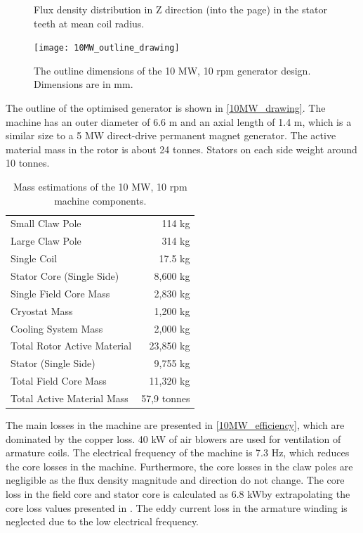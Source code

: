 \documentclass[final,peerreview,onecolumn]{IEEEtran}
\begin{document}
\begin{figure}[]
  \centering
  \hfill
   \caption{Flux density distribution in Z direction (into the page) in the stator teeth at mean coil radius.} 
    \label{10MW_tooth_Bz}
\end{figure}

\begin{figure}[t]
  \centering
    \texttt{[image: 10MW\_outline\_drawing]}
  \caption{The outline dimensions of the 10 MW, 10 rpm generator design. Dimensions are in mm.}
  \label{10MW_drawing}
\end{figure}

The outline of the optimised generator is shown in \autoref{10MW_drawing}. The machine has an outer diameter of 6.6 m and an axial length of 1.4 m, which is a similar size to a 5 MW direct-drive permanent magnet generator.
The active material mass in the rotor is about 24 tonnes. Stators on each side weight around 10 tonnes.

\begin{table}[t]
  \centering
  \begin{tabular}{lr}
\hline
Small Claw Pole & 114 kg \\
Large Claw Pole & 314 kg \\
Single Coil & 17.5 kg \\
Stator Core (Single Side) & 8,600 kg \\
Single Field Core Mass & 2,830 kg \\
\hline
Cryostat Mass & 1,200 kg \\
Cooling System Mass & 2,000 kg \\
Total Rotor Active Material & 23,850 kg \\
Stator (Single Side) & 9,755 kg \\
Total Field Core Mass & 11,320 kg \\
\hline
Total Active Material Mass & 57,9 tonnes \\
\hline
 \end{tabular}
  \caption{Mass estimations of the 10 MW, 10 rpm machine components.}
  \label{10MW_mass_spec}
\end{table}

The main losses in the machine are presented in \autoref{10MW_efficiency}, which are dominated by the copper loss. 40 kW of air blowers are used for ventilation of armature coils. 
The electrical frequency of the machine is 7.3 Hz, which reduces the core losses in the machine. Furthermore, the core losses in the claw poles are negligible as the flux density magnitude and direction do not change. The core loss in the field core and stator core is calculated as 6.8 kW\footnotemark[\value{footnote}] by extrapolating the core loss values presented in \cite{vacoflux}. The eddy current loss in the armature winding is neglected due to the low electrical frequency.
\end{document}
